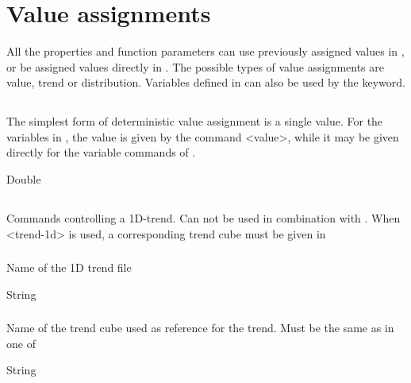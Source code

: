 {\section{Value assignments}
\label{sec:valueassignment}
All the properties and function parameters can use previously assigned values in , or be assigned values directly in . The possible types of value assignments are value, trend or distribution. Variables defined in  can also be used by the  keyword.

\subsection{}
 \slist
   \item \Description The simplest form of deterministic value assignment is a single value. For the variables in , the value is given by the command <value>, while it may be given directly for the variable commands of . 
   \item \Argument Double
   \item \Default 
 \elist

\subsection{}
 \slist
   \item \Description Commands controlling a 1D-trend. Can not be used in combination with . When <trend-1d> is used, a corresponding trend cube must be given in 
   \item \Argument
   \item \Default 
 \elist

\subsubsection{}
 \slist
   \item \Description Name of the 1D trend file
   \item \Argument String
   \item \Default 
 \elist

\subsubsection{}
 \slist
   \item \Description Name of the trend cube used as reference for the trend. Must be the same as  in one of 
   \item \Argument String
   \item \Default 
 \elist

}
